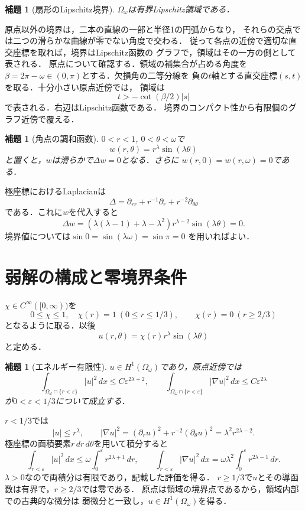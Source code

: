 \documentclass[a5paper,10pt,onecolumn]{jsarticle}
\makeatletter
\theoremstyle{mathnotetheorem}
\newtheorem{lemma}[theorem]{補題}
\renewcommand{\proofname}{証明}
\renewenvironment{proof}[1][\proofname]{%
  \par\pushQED{\qed}\normalfont\topsep4\p@\@plus2\p@\relax
  \trivlist\item[\hskip\labelsep\bfseries #1]\ignorespaces
}{\popQED\endtrivlist\@endpefalse}
\makeatother
\begin{document}
\begin{lemma}[扇形のLipschitz境界]\label{corner:lem:lipschitz}
$\Omega_\omega$は有界Lipschitz領域である．
\end{lemma}
\begin{proof}
原点以外の境界は，二本の直線の一部と半径1の円弧からなり，
それらの交点では二つの滑らかな曲線が零でない角度で交わる．
従って各点の近傍で適切な直交座標を取れば，境界はLipschitz函数の
グラフで，領域はその一方の側として表される．
原点について確認する．領域の補集合が占める角度を
$\beta=2\pi-\omega\in(0,\pi)$とする．欠損角の二等分線を
負の$t$軸とする直交座標$(s,t)$を取る．十分小さい原点近傍では，
領域は
\[
 t>-\cot(\beta/2)|s|
\]
で表される．右辺はLipschitz函数である．
境界のコンパクト性から有限個のグラフ近傍で覆える．
\end{proof}

\begin{lemma}[角点の調和函数]\label{corner:lem:harmonic}
$0<r<1$, $0<\theta<\omega$で
\[
 w(r,\theta)=r^\lambda\sin(\lambda\theta)
\]
と置くと，$w$は滑らかで$\Delta w=0$となる．さらに
$w(r,0)=w(r,\omega)=0$である．
\end{lemma}
\begin{proof}
極座標におけるLaplacianは
\[
 \Delta=\partial_{rr}+r^{-1}\partial_r+r^{-2}\partial_{\theta\theta}
\]
である．これに$w$を代入すると
\[
 \Delta w=(\lambda(\lambda-1)+\lambda-\lambda^2)
 r^{\lambda-2}\sin(\lambda\theta)=0.
\]
境界値については$\sin0=\sin(\lambda\omega)=\sin\pi=0$
を用いればよい．
\end{proof}

\section{弱解の構成と零境界条件}
$\chi\in C^\infty([0,\infty))$を
\[
 0\le\chi\le1,\quad
 \chi(r)=1\ (0\le r\le1/3),\qquad
 \chi(r)=0\ (r\ge2/3)
\]
となるように取る．以後
\[
 u(r,\theta)=\chi(r)r^\lambda\sin(\lambda\theta)
\]
と定める．

\begin{lemma}[エネルギー有限性]\label{corner:lem:H1}
$u\in H^1(\Omega_\omega)$であり，原点近傍では
\[
 \int_{\Omega_\omega\cap\{r<\varepsilon\}}|u|^2\,dx
      \le C\varepsilon^{2\lambda+2},\qquad
 \int_{\Omega_\omega\cap\{r<\varepsilon\}}|\nabla u|^2\,dx
      \le C\varepsilon^{2\lambda}
\]
が$0<\varepsilon<1/3$について成立する．
\end{lemma}
\begin{proof}
$r<1/3$では
\[
 |u|\le r^\lambda,\qquad
 |\nabla u|^2=(\partial_r u)^2+r^{-2}(\partial_\theta u)^2
             =\lambda^2r^{2\lambda-2}.
\]
極座標の面積要素$r\,dr\,d\theta$を用いて積分すると
\[
 \int_{r<\varepsilon}|u|^2\,dx
   \le\omega\int_0^\varepsilon r^{2\lambda+1}\,dr,
 \qquad
 \int_{r<\varepsilon}|\nabla u|^2\,dx
   =\omega\lambda^2\int_0^\varepsilon r^{2\lambda-1}\,dr.
\]
$\lambda>0$なので両積分は有限であり，記載した評価を得る．
$r\ge1/3$で$u$とその導函数は有界で，$r\ge2/3$では零である．
原点は領域の境界点であるから，領域内部での古典的な微分は
弱微分と一致し，$u\in H^1(\Omega_\omega)$を得る．
\end{proof}
\end{document}
